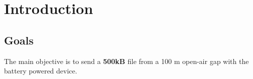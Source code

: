 \newpage

\section{Introduction}\label{01Sec:Introduction}


\subsection{Goals}\label{01Sub:Goals}

The main objective is to send a \textbf{500kB} file from a 100 m open-air gap with
the battery powered device.

\cite{Penrose2020} \\ 

\cite{Franklin2013} \\ 

\cite{Schenato2009}

